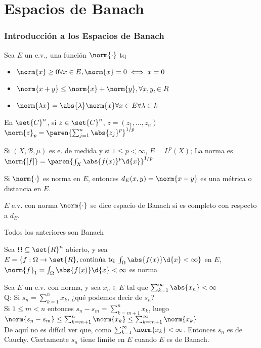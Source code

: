 \documentclass{notetaking}
\begin{document}
\part{Espacios de Banach}
\section{Introducción a los Espacios de Banach}
\begin{defn}
    Sea \(E\) un e.v., una función \(\norm{\cdot}\) tq
    \begin{itemize}
        \item \(\norm{x}\geq0\forall x\in E, \norm{x}=0\iff x=0\)
        \item \(\norm{x+y}\leq\norm{x}+\norm{y},\forall x,y,\in R\)
        \item \(\norm{\lambda x}=\abs{\lambda}\norm{x}\forall x\in E\forall\lambda\in k\)
    \end{itemize}
\end{defn}
\begin{ejm}
    En \(\set{C}^n\), si \(z\in\set{C}^n\), \(z=(z_1,\dots,z_n)\) \(\norm{z}_p=\paren{\sum_{j=1}^n\abs{z_j}^p}^{1/p}\)
\end{ejm}
\begin{ejm}
    Si \((X,\mathcal{B},\mu)\) es e. de medida y si \(1\leq p<\infty\), \(E=L^p(X)\); La norma es \(\norm{[f]}=\paren{\int_X\abs{f(x)}^p\d{x}}^{1/p}\)
\end{ejm}
\begin{obs}
    Si \(\norm{\cdot}\) es norma en \(E\), entonces \(d_E(x,y)=\norm{x-y}\) es una métrica o distancia en \(E\).
\end{obs}
\begin{defn}
    \(E\) e.v. con norma \(\norm{\cdot}\) se dice espacio de Banach si es completo con respecto a \(d_E\).
\end{defn}
\begin{ejm}
    Todos los anteriores son Banach
\end{ejm}
\begin{ejm}
    Sea \(\Omega\subseteq\set{R}^n\) abierto, y sea \(E=\{f:\Omega\rightarrow\set{R},\text{continúa tq }\int_\Omega\abs{f(x)}\d{x}<\infty\}\) en \(E\), \(\norm{f}_1=\int_\Omega\abs{f(x)}\d{x}<\infty\) es norma
\end{ejm}
\begin{ejm}
    Sea \(E\) un e.v. con norma, y sea \(x_n\in E\) tal que \(\sum_{k=1}^\infty\abs{x_n}<\infty\)\\
    Q: Si \(s_n=\sum_{k=1}^n x_k\), ¿qué podemos decir de \(s_n\)?\\
    Si \(1\leq m< n\) entonces \(s_n-s_m=\sum_{k=m+1}^nx_k\), luego \(\norm{s_n-s_m}\leq\sum_{k=m+1}^n\norm{x_k}\leq\sum_{k=m+1}^\infty\norm{x_k}\)\\
    De aquí no es difícil ver que, como \(\sum_{k=1}^\infty\norm{x_k}<\infty\). Entonces \(s_n\) es de Cauchy. Ciertamente \(s_n\) tiene límite en \(E\) cuando \(E\) es de Banach.
\end{ejm}
\end{document}
